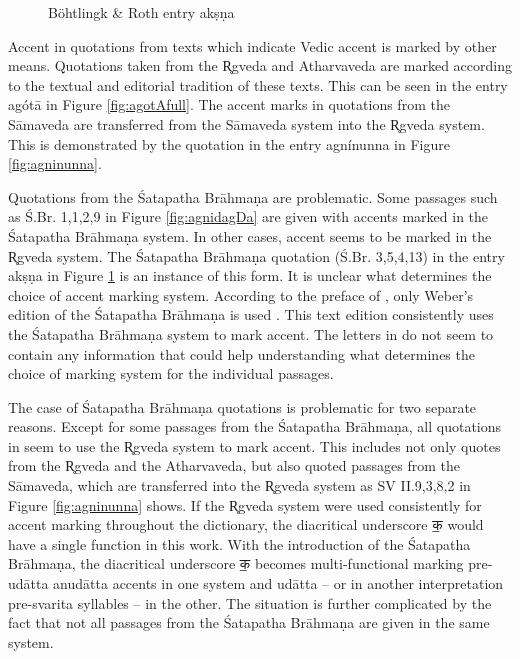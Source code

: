 \begin{figure}[!ht]
\begin{center}
\end{center}
\caption[Böhtlingk \& Roth entry akṣṇa]{\label{fig:akSNaya}Böhtlingk \& Roth entry akṣṇa}
\end{figure}

Accent in quotations from texts which indicate Vedic accent is marked by other means. Quotations taken from the R̥gveda and Atharvaveda are marked according to the textual and editorial tradition of these texts. This can be seen in the entry agótā in Figure \ref{fig:agotAfull}. The accent marks in quotations from the Sāmaveda are transferred from the Sāmaveda system into the R̥gveda system. This is demonstrated by the quotation in the entry agnínunna in Figure \ref{fig:agninunna}.

Quotations from the Śatapatha Brāhmaṇa are problematic. Some passages such as Ś.Br. 1,1,2,9 in Figure \ref{fig:agnidagDa} are given with accents marked in the Śatapatha Brāhmaṇa system. In other cases, accent seems to be marked in the R̥gveda system. The Śatapatha Brāhmaṇa quotation (Ś.Br. 3,5,4,13) in the entry akṣṇa in Figure \ref{fig:akSNaya} is an instance of this form. It is unclear what determines the choice of accent marking system. According to the preface of \citet{pwg}, only Weber’s edition of the Śatapatha Brāhmaṇa is used \citep{Weber1849}. This text edition consistently uses the Śatapatha Brāhmaṇa system to mark accent. The letters in \cite{BruecknerZeller2007} do not seem to contain any information that could help understanding what determines the choice of marking system for the individual passages.

The case of Śatapatha Brāhmaṇa quotations is problematic for two separate reasons. Except for some passages from the Śatapatha Brāhmaṇa, all quotations in \citet{pwg} seem to use the R̥gveda system to mark accent. This includes not only quotes from the R̥gveda and the Atharvaveda, but also quoted passages from the Sāmaveda, which are transferred into the R̥gveda system as SV II.9,3,8,2 in Figure \ref{fig:agninunna} shows. If the R̥gveda system were used consistently for accent marking throughout the dictionary, the diacritical underscore {\devfont क॒} would have a single function in this work. With the introduction of the Śatapatha Brāhmaṇa, the diacritical underscore {\devfont क॒} becomes multi-functional marking pre-udātta anudātta accents in one system and udātta – or in another interpretation pre-svarita syllables – in the other. The situation is further complicated by the fact that not all passages from the Śatapatha Brāhmaṇa are given in the same system.

